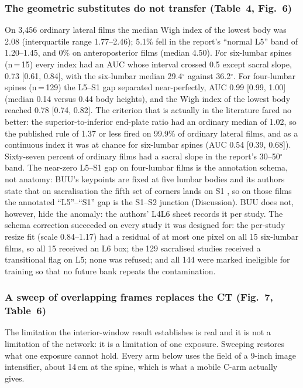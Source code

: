 \documentclass[11pt,letterpaper]{article}
\newcommand{\ci}[2]{[#1, #2]}
\begin{document}
\subsubsection*{The geometric substitutes do not transfer (Table~4, Fig.~6)}
On 3,456 ordinary lateral films the median Wigh index of the lowest body was 2.08 (interquartile range 1.77--2.46); 5.1\% fell in the report's ``normal L5'' band of 1.20--1.45, and 0\% on anteroposterior films (median 4.50). For six-lumbar spines (n\,=\,15) every index had an AUC whose interval crossed 0.5 except sacral slope, 0.73 \ci{0.61}{0.84}, with the six-lumbar median 29.4$^\circ$ against 36.2$^\circ$. For four-lumbar spines (n\,=\,129) the L5--S1 gap separated near-perfectly, AUC 0.99 \ci{0.99}{1.00} (median 0.14 versus 0.44 body heights), and the Wigh index of the lowest body reached 0.78 \ci{0.74}{0.82}. The criterion that is actually in the literature fared no better: the superior-to-inferior end-plate ratio had an ordinary median of 1.02, so the published rule of 1.37 or less fired on 99.9\% of ordinary lateral films, and as a continuous index it was at chance for six-lumbar spines (AUC 0.54 \ci{0.39}{0.68}). Sixty-seven percent of ordinary films had a sacral slope in the report's 30--50$^\circ$ band. The near-zero L5--S1 gap on four-lumbar films is the annotation schema, not anatomy: BUU's keypoints are fixed at five lumbar bodies and its authors state that on sacralisation the fifth set of corners lands on S1 \citep{buu2023}, so on those films the annotated ``L5''--``S1'' gap is the S1--S2 junction (Discussion). BUU does not, however, hide the anomaly: the authors' L4L6 sheet records it per study. The schema correction succeeded on every study it was designed for: the per-study resize fit (scale 0.84--1.17) had a residual of at most one pixel on all 15 six-lumbar films, so all 15 received an L6 box; the 129 sacralised studies received a transitional flag on L5; none was refused; and all 144 were marked ineligible for training so that no future bank repeats the contamination.

\subsubsection*{A sweep of overlapping frames replaces the CT (Fig.~7, Table~6)}
The limitation the interior-window result establishes is real and it is not a limitation of the network: it is a limitation of one exposure. Sweeping restores what one exposure cannot hold. Every arm below uses the field of a 9-inch image intensifier, about 14\,cm at the spine, which is what a mobile C-arm actually gives.
\end{document}
